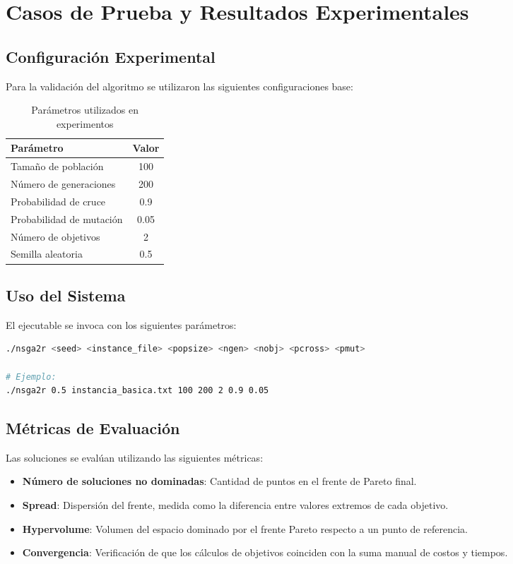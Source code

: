 \documentclass[preprint,12pt,authoryear]{elsarticle}
\begin{document}
\section{Casos de Prueba y Resultados Experimentales}

\subsection{Configuración Experimental}

Para la validación del algoritmo se utilizaron las siguientes configuraciones base:

\begin{table}[h]
\centering
\caption{Parámetros utilizados en experimentos}
\begin{tabular}{|l|c|}
\hline
\textbf{Parámetro} & \textbf{Valor} \\
\hline
Tamaño de población & 100 \\
Número de generaciones & 200 \\
Probabilidad de cruce & 0.9 \\
Probabilidad de mutación & 0.05 \\
Número de objetivos & 2 \\
Semilla aleatoria & 0.5 \\
\hline
\end{tabular}
\end{table}

\subsection{Uso del Sistema}

El ejecutable se invoca con los siguientes parámetros:

\begin{lstlisting}[language=bash]
./nsga2r <seed> <instance_file> <popsize> <ngen> <nobj> <pcross> <pmut>

# Ejemplo:
./nsga2r 0.5 instancia_basica.txt 100 200 2 0.9 0.05
\end{lstlisting}

\subsection{Métricas de Evaluación}

Las soluciones se evalúan utilizando las siguientes métricas:

\begin{itemize}
    \item \textbf{Número de soluciones no dominadas}: Cantidad de puntos en el frente de Pareto final.
    \item \textbf{Spread}: Dispersión del frente, medida como la diferencia entre valores extremos de cada objetivo.
    \item \textbf{Hypervolume}: Volumen del espacio dominado por el frente Pareto respecto a un punto de referencia.
    \item \textbf{Convergencia}: Verificación de que los cálculos de objetivos coinciden con la suma manual de costos y tiempos.
\end{itemize}
\end{document}

